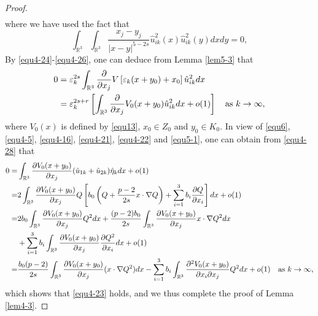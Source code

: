 \documentclass[reqno, 11pt]{amsart} %
\numberwithin{equation}{section}
\begin{document}
\begin{proof}
\begin{equation}
\begin{split}
			\end{split}
		\end{equation}
		where we have used the fact that
		\begin{equation*}
			\int_{\mathbb{R}^{3}}\int_{\mathbb{R}^{3}}\frac{x_{j}-y_{j}}{|x-y|^{5-2s}}\hat{u}_{ik}^{2}(x)\hat{u}_{ik}^{2}(y)dxdy=0,
		\end{equation*}
		By \eqref{equ4-24}-\eqref{equ4-26}, one can deduce from Lemma \ref{lem5-3} that
		\begin{equation}\label{equ4-28}
			\begin{split}
				0&=\varepsilon_{k}^{2s}\int_{\mathbb{R}^{3}}\frac{\partial}{\partial x_{j}}V\left[\varepsilon_{k}(x+y_{0})+x_{0} \right] \hat{u}_{ik}^{2}dx\\
				&=\varepsilon_{k}^{2s+r}\left[ \int_{\mathbb{R}^{3}}\frac{\partial}{\partial x_{j}}V_{0}(x+y_{0})\hat{u}_{ik}^{2}dx+o(1)\right] \quad \hbox{as $k\rightarrow\infty$},
			\end{split}
		\end{equation}
		where $V_{0}(x)$ is defined by \eqref{equ13}, $x_{0}\in Z_{0}$ and $y_{0}\in K_{0}$. In view of \eqref{equ6}, \eqref{equ4-5}, \eqref{equ4-16}, \eqref{equ4-21}, \eqref{equ4-22} and \eqref{equ5-1}, one can obtain from \eqref{equ4-28} that
		\begin{equation*}
			\begin{split}
				0=&\int_{\mathbb{R}^{3}}\frac{\partial V_{0}(x+y_{0})}{\partial x_{j}}(\hat{u}_{1k}+\hat{u}_{2k})\hat{\eta}_{k}dx+o(1)\\
				=&2\int_{\mathbb{R}^{3}}\frac{\partial V_{0}(x+y_{0})}{\partial x_{j}}Q\left[ b_{0}\left(Q+\frac{p-2}{2s}x\cdot\nabla Q\right)+\sum_{i=1}^{3}b_{i}\frac{\partial Q}{\partial x_{i}}\right] dx+o(1)\\
				=&2b_{0}\int_{\mathbb{R}^{3}}\frac{\partial V_{0}(x+y_{0})}{\partial x_{j}}Q^{2}dx+\frac{(p-2)b_{0}}{2s}\int_{\mathbb{R}^{3}}\frac{\partial V_{0}(x+y_{0})}{\partial x_{j}}x\cdot\nabla Q^{2}dx\\
				&+\sum_{i=1}^{3}b_{i}\int_{\mathbb{R}^{3}}\frac{\partial V_{0}(x+y_{0})}{\partial x_{j}}\frac{\partial Q^{2}}{\partial x_{i}}dx+o(1)\\
				=&\frac{b_{0}(p-2)}{2s}\int_{\mathbb{R}^{3}}\frac{\partial V_{0}(x+y_{0})}{\partial x_{j}}(x\cdot\nabla Q^{2})dx-\sum^{3}_{i=1}
				b_{i}\int_{\mathbb{R}^{3}}\frac{\partial^{2}V_{0}(x+y_{0})}{\partial x_{i}\partial x_{j}}Q^{2}dx+o(1)\quad \hbox{as $k\rightarrow\infty$},
			\end{split}
		\end{equation*}
		which shows that \eqref{equ4-23} holds, and we thus complete the proof of Lemma \ref{lem4-3}.
	\end{proof}
	
\end{document}
